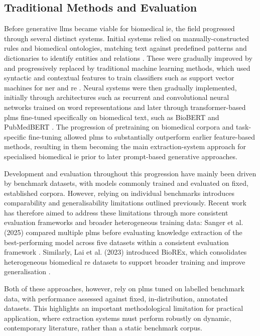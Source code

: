 \subsection{Traditional Methods and Evaluation}
\label{subsec:lit:traditional_methods}
Before generative \glspl{llm} became viable for biomedical \gls{ie}, the field progressed through several distinct systems. Initial systems relied on manually-constructed rules and biomedical ontologies, matching text against predefined patterns and dictionaries to identify entities and relations \pref. These were gradually improved by and progressively replaced by traditional machine learning methods, which used syntactic and contextual features to train classifiers such as support vector machines for \gls{ner} and \gls{re} \pref. Neural systems were then gradually implemented, initially through architectures such as recurrent and convolutional neural networks trained on word representations and later through transformer-based \glspl{plm} fine-tuned specifically on biomedical text, such as BioBERT and PubMedBERT \pref. The progression of pretraining on biomedical corpora and task-specific fine-tuning allowed \glspl{plm} to substantially outperform earlier feature-based methods, resulting in them becoming the main extraction-system approach for specialised biomedical \gls{ie} prior to later prompt-based generative approaches.

Development and evaluation throughout this progression have mainly been driven by benchmark datasets, with models commonly trained and evaluated on fixed, established corpora. However, relying on individual benchmarks introduces comparability and generalisability limitations outlined previously. Recent work has therefore aimed to address these limitations through more consistent evaluation frameworks and broader heterogeneous training data: Sanger et al. (2025) compared multiple \glspl{plm} before evaluating knowledge extraction of the best-performing model across five datasets within a consistent evaluation framework \cite{sanger2025_fixed_dataset_eval_2}. Similarly, Lai et al. (2023) introduced BioREx, which consolidates heterogeneous biomedical \gls{re} datasets to support broader training and improve generalisation \cite{lai2023_fixed_dataset_eval}.

Both of these approaches, however, rely on \glspl{plm} tuned on labelled benchmark data, with performance assessed against fixed, in-distribution, annotated datasets. This highlights an important methodological limitation for practical application, where extraction systems must perform robustly on dynamic, contemporary literature, rather than a static benchmark corpus.

